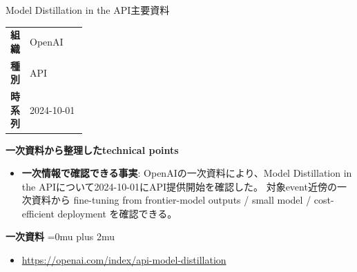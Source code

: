 \begin{technicalnote}{Model Distillation in the API}{主要資料}
\begingroup
\begin{tabularx}{\linewidth}{@{}>{\bfseries}p{0.22\linewidth}X@{}}
組織 & OpenAI \\
種別 & API \\
時系列 & 2024-10-01 \\
\end{tabularx}
\smallskip
{\bfseries 一次資料から整理したtechnical points}
\begin{itemize}[leftmargin=1.5em,itemsep=0.35em]
\item \textbf{一次情報で確認できる事実}: OpenAIの一次資料により、Model Distillation in the APIについて2024-10-01にAPI提供開始を確認した。 対象event近傍の一次資料から fine-tuning from frontier-model outputs / small model / cost-efficient deployment を確認できる。
\end{itemize}
\begin{minipage}{\linewidth}
\begin{samepage}
{\bfseries 一次資料}
\begingroup\sloppy
\Urlmuskip=0mu plus 2mu\relax
\begin{itemize}[leftmargin=1.5em,itemsep=0.25em]
\item {\scriptsize\url{https://openai.com/index/api-model-distillation}}
\end{itemize}
\endgroup
\end{samepage}
\end{minipage}
\endgroup
\end{technicalnote}
\medskip

